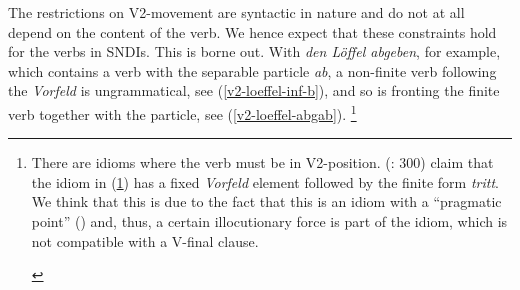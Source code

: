 \documentclass[output=paper]{langsci/langscibook}
\begin{document}
The restrictions on V2-movement are syntactic in nature and do not at all depend on the content of the verb. We hence expect that these constraints hold for the verbs in SNDIs. This is borne out. With \textit{den L\"offel abgeben}, for example, which contains a verb with the separable particle \textit{ab}, a non-finite verb following the \textit{Vorfeld} is ungrammatical, see (\ref{v2-loeffel-inf-b}), and so is fronting the finite verb together with the particle, see (\ref{v2-loeffel-abgab}).%
\footnote{\label{fn-pferd}There are idioms where the verb must be in V2-position. \citeauthor{Richter:Sailer:09} (\citeyear{Richter:Sailer:09}: 300) claim that the idiom in (\ref{pferd}) has a fixed \textit{Vorfeld} element followed by the finite form \textit{tritt}. We think that this is due to the fact that this is an idiom with a ``pragmatic point'' (\citealt{FillmoreEtAl1988}) and, thus, a certain illocutionary force is part of the idiom, which is not compatible with a V-final clause. 

\begin{exe}
\ex\label{pferd}
\begin{xlist}
\end{xlist}
\end{exe}

}

\begin{exe}
\ex\label{v2-loeffel-inf}
\begin{xlist}
\end{xlist}
\end{exe}

\begin{exe}
\ex\label{v2-loeffel}
\begin{xlist}
\end{xlist}
\end{exe}
\end{document}
